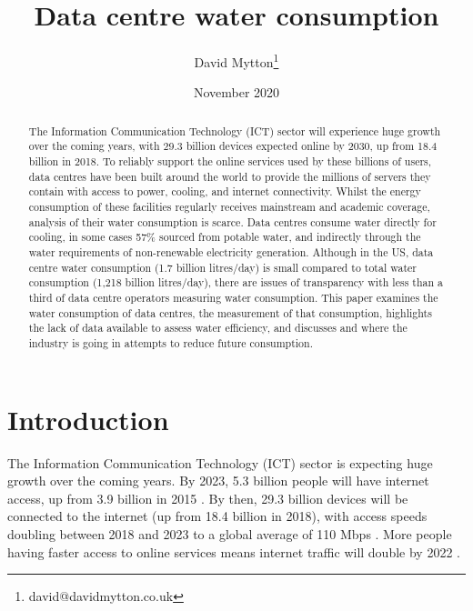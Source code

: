 \documentclass{article}
\begin{document}
\linenumbers

\title{Data centre water consumption}
\author[1]{David Mytton\thanks{david@davidmytton.co.uk}}

\date{November 2020}

\maketitle

\begin{abstract}
    The Information Communication Technology (ICT) sector will
    experience huge growth over the coming years, with 29.3 billion devices
    expected online by 2030, up from 18.4 billion in 2018. To reliably support
    the online services used by these billions of users, data centres have been
    built around the world to provide the millions of servers they contain with
    access to power, cooling, and internet connectivity. Whilst the energy
    consumption of these facilities regularly receives mainstream and academic
    coverage, analysis of their water consumption is scarce. Data centres
    consume water directly for cooling, in some cases 57\% sourced from potable
    water, and indirectly through the water requirements of non-renewable
    electricity generation. Although in the US, data centre water consumption
    (1.7 billion litres/day) is small compared to total water consumption
    (1,218 billion litres/day), there are issues of transparency with less than
    a third of data centre operators measuring water consumption. This paper
    examines the water consumption of data centres, the measurement of that
    consumption, highlights the lack of data available to assess water
    efficiency, and discusses and where the industry is going in attempts to
    reduce future consumption.
\end{abstract}

\section*{Introduction}

The Information Communication Technology (ICT) sector is expecting huge growth
over the coming years. By 2023, 5.3 billion people will have internet access,
up from 3.9 billion in 2015 \cite{cisco_cisco_2020}. By then, 29.3 billion
devices will be connected to the internet (up from 18.4 billion in 2018), with
access speeds doubling between 2018 and 2023 to a global average of 110 Mbps
\cite{cisco_cisco_2020}. More people having faster access to online services
means internet traffic will double by 2022 \cite{kamiya_data_2020}.
\end{document}
